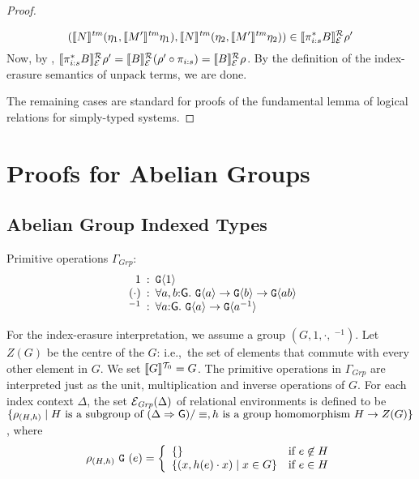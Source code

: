 \begin{proof}
\begin{description}
\begin{displaymath}
      (\llbracket N \rrbracket^{\mathit{tm}}(\eta_1,\llbracket M' \rrbracket^{\mathit{tm}}\eta_1),
       \llbracket N \rrbracket^{\mathit{tm}}(\eta_2,\llbracket M' \rrbracket^{\mathit{tm}}\eta_2)) \in \llbracket \pi_{i\mathord:s}^*B \rrbracket^{\mathcal{R}}_{\mathcal{E}}{\rho'}
    \end{displaymath}
    Now, by ,
    $\llbracket \pi_{i\mathord:s}^*B \rrbracket^{\mathcal{R}}_{\mathcal{E}}{\rho'} =
    \llbracket B \rrbracket^{\mathcal{R}}_{\mathcal{E}}{(\rho' \circ \pi_{i\mathord:s})} =
    \llbracket B \rrbracket^{\mathcal{R}}_{\mathcal{E}}{\rho}$. By the definition of the
    index-erasure semantics of $\mathrm{unpack}$ terms, we are done.
  \end{description}
  The remaining cases are standard for proofs of the fundamental lemma
  of logical relations for simply-typed systems.
\end{proof}

\section{Proofs for Abelian Groups}
\subsection{Abelian Group Indexed Types}
\label{sec:abelian-group-indexed-types}

\newcommand{\Grp}{\mathit{Grp}}

Primitive operations $\Gamma_\Grp$:
\begin{displaymath}
  \begin{array}{r@{\hspace{0.5em}:\hspace{0.5em}}l}
    1 & \tyPrim{G}{1} \\
    (\cdot) & \forall a,b\mathord:\mathsf{G}.\ \tyPrim{G}{a} \to \tyPrim{G}{b} \to \tyPrim{G}{a b} \\
    \ ^{-1} & \forall a\mathord:\mathsf{G}.\ \tyPrim{G}{a} \to \tyPrim{G}{a^{-1}}
  \end{array}
\end{displaymath}

For the index-erasure interpretation, we assume a group $(G, 1, \cdot,
\ ^{-1})$. Let $Z(G)$ be the centre of the $G$: i.e.,~the set of
elements that commute with every other element in $G$. We set
$\llbracket G \rrbracket^{\mathcal{T}_0} = G$. The primitive operations in $\Gamma_\Grp$ are
interpreted just as the unit, multiplication and inverse operations
of $G$. For each index context $\Delta$, the set
$\relEnv{E}_\Grp(\Delta)$ of relational environments is defined to be
$\{ \rho_{(H,h)} \mathrel| H\textrm{ is a subgroup of }(\Delta
\Rightarrow \mathsf{G})/\equiv, h\textrm{ is a group homomorphism }H
\to Z(G) \}$, where
\begin{displaymath}
  \rho_{(H,h)}\ \tyPrimNm{G}\ (e) = \left\{
    \begin{array}{ll}
      \{ \} & \textrm{if}\ e\not\in H \\
      \{ (x, h(e)\cdot x) \sepbar x \in G \} & \textrm{if}\ e\in H
    \end{array}
  \right.
\end{displaymath}

